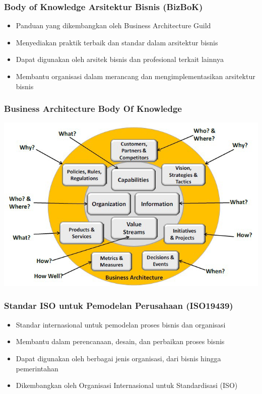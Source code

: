 \documentclass{beamer}
\begin{document}
	\begin{frame}
		\frametitle{Body of Knowledge Arsitektur Bisnis (BizBoK)}
		\begin{itemize}
			\item Panduan yang dikembangkan oleh Business Architecture Guild
			\item Menyediakan praktik terbaik dan standar dalam arsitektur bisnis
			\item Dapat digunakan oleh arsitek bisnis dan profesional terkait lainnya
			\item Membantu organisasi dalam merancang dan mengimplementasikan arsitektur bisnis
		\end{itemize}
	\end{frame}
	
		{
		\begin{frame}
			\frametitle{Business Architecture Body Of Knowledge}
			\begin{center}
				\includegraphics[width=1\textwidth]{../figures/bizbok}
			\end{center}
		\end{frame}
	}

	\begin{frame}
		\frametitle{Standar ISO untuk Pemodelan Perusahaan (ISO19439)}
		\begin{itemize}
			\item Standar internasional untuk pemodelan proses bisnis dan organisasi
			\item Membantu dalam perencanaan, desain, dan perbaikan proses bisnis
			\item Dapat digunakan oleh berbagai jenis organisasi, dari bisnis hingga pemerintahan
			\item Dikembangkan oleh Organisasi Internasional untuk Standardisasi (ISO)
		\end{itemize}
	\end{frame}
	
\end{document}
